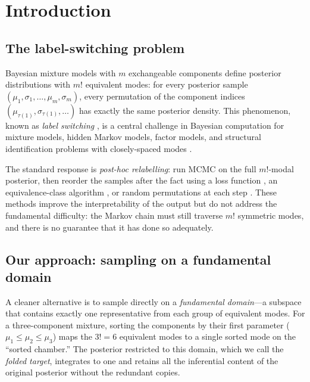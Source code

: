 %  

\section{Introduction}
\label{sec:introduction}

\subsection{The label-switching problem}

Bayesian mixture models with $m$ exchangeable components define
posterior distributions with $m!$ equivalent modes: for every
posterior sample $(\mu_1, \sigma_1, \ldots, \mu_m, \sigma_m)$,
every permutation of the component indices
$(\mu_{\tau(1)}, \sigma_{\tau(1)}, \ldots)$ has exactly the
same posterior density.  This phenomenon, known as
\emph{label switching} \citep{Stephens2000,Jasra2005,Celeux2000},
is a central challenge in Bayesian computation for mixture models,
hidden Markov models, factor models, and structural identification
problems with closely-spaced modes
\citep{Au2011,YangLamBeck2019}.

The standard response is \emph{post-hoc relabelling}: run MCMC
on the full $m!$-modal posterior, then reorder the samples after
the fact using a loss function \citep{Stephens2000}, an
equivalence-class algorithm \citep{Papastamoulis2010}, or random
permutations at each step \citep{FruhwirthSchnatter2001}.
These methods improve the interpretability of the output
but do not address the fundamental difficulty: the Markov chain
must still traverse $m!$ symmetric modes, and there is no
guarantee that it has done so adequately.

\subsection{Our approach: sampling on a fundamental domain}

A cleaner alternative is to sample directly on a
\emph{fundamental domain}---a subspace that contains exactly
one representative from each group of equivalent modes.
For a three-component mixture, sorting the components by their
first parameter ($\mu_1 \leq \mu_2 \leq \mu_3$) maps the
$3! = 6$ equivalent modes to a single sorted mode on the
``sorted chamber.''  The posterior restricted to this domain,
which we call the \emph{folded target}, integrates to one
and retains all the inferential content of the original posterior
without the redundant copies.

